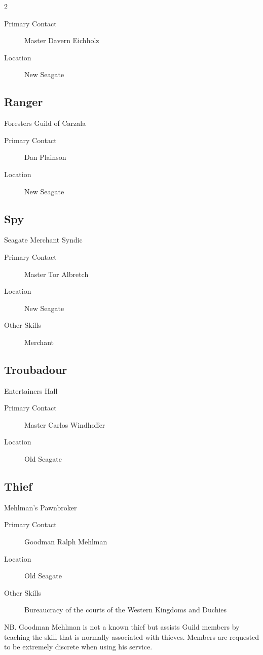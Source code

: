 \begin{multicols}{2}
\begin{description}
\item[Primary Contact] Master Davern Eichholz
\item[Location] New Seagate
\end{description}

\subsection{Ranger}

Foresters Guild of Carzala

\begin{description}
\item[Primary Contact] Dan Plainson
\item[Location] New Seagate
\end{description}

\subsection{Spy}

Seagate Merchant Syndic

\begin{description}
\item[Primary Contact] Master Tor Albretch
\item[Location] New Seagate
\item[Other Skills] Merchant
\end{description}

\subsection{Troubadour}

Entertainers Hall

\begin{description}
\item[Primary Contact] Master Carlos Windhoffer
\item[Location] Old Seagate
\end{description}

\subsection{Thief}

Mehlman’s Pawnbroker

\begin{description}
\item[Primary Contact] Goodman Ralph Mehlman
\item[Location] Old Seagate
\item[Other Skills] Bureaucracy of the courts of the
Western Kingdoms and Duchies
\end{description}

NB. Goodman Mehlman is not a known thief but assists Guild members by
teaching the skill that is normally associated with thieves.  Members
are requested to be extremely discrete when using his service.

\end{multicols}
